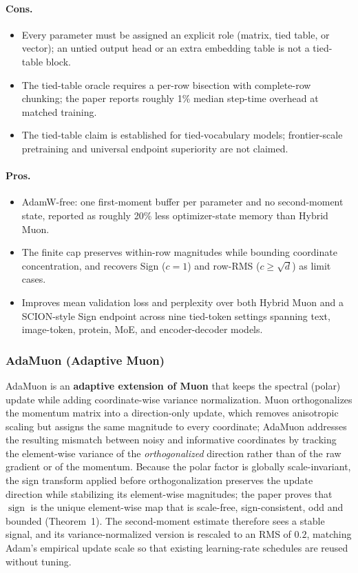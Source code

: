 \paragraph{Cons.}
\begin{itemize}[leftmargin=*]
\item Every parameter must be assigned an explicit role (matrix, tied table, or vector); an untied output head or an extra embedding table is not a tied-table block.
\item The tied-table oracle requires a per-row bisection with complete-row chunking; the paper reports roughly 1\% median step-time overhead at matched training.
\item The tied-table claim is established for tied-vocabulary models; frontier-scale pretraining and universal endpoint superiority are not claimed.
\end{itemize}

\paragraph{Pros.}
\begin{itemize}[leftmargin=*]
\item AdamW-free: one first-moment buffer per parameter and no second-moment state, reported as roughly 20\% less optimizer-state memory than Hybrid Muon.
\item The finite cap preserves within-row magnitudes while bounding coordinate concentration, and recovers Sign ($c=1$) and row-RMS ($c \geq \sqrt{d}$) as limit cases.
\item Improves mean validation loss and perplexity over both Hybrid Muon and a SCION-style Sign endpoint across nine tied-token settings spanning text, image-token, protein, MoE, and encoder-decoder models.
\end{itemize}

\subsubsection{AdaMuon (Adaptive Muon)}
AdaMuon is an \textbf{adaptive extension of Muon} that keeps the spectral (polar) update while adding coordinate-wise variance normalization. Muon orthogonalizes the momentum matrix into a direction-only update, which removes anisotropic scaling but assigns the same magnitude to every coordinate; AdaMuon addresses the resulting mismatch between noisy and informative coordinates by tracking the element-wise variance of the \emph{orthogonalized} direction rather than of the raw gradient or of the momentum. Because the polar factor is globally scale-invariant, the sign transform applied before orthogonalization preserves the update direction while stabilizing its element-wise magnitudes; the paper proves that $\operatorname{sign}$ is the unique element-wise map that is scale-free, sign-consistent, odd and bounded (Theorem~1). The second-moment estimate therefore sees a stable signal, and its variance-normalized version is rescaled to an RMS of $0.2$, matching Adam's empirical update scale so that existing learning-rate schedules are reused without tuning.

